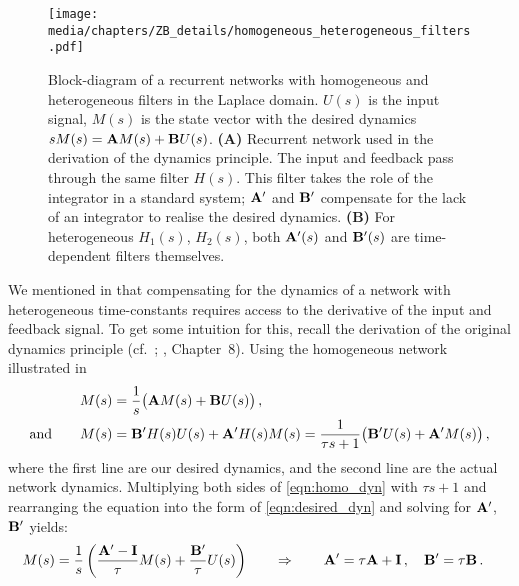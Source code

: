 \begin{figure}
	\texttt{[image: media/chapters/ZB\_details/homogeneous\_heterogeneous\_filters.pdf]}%
	{\label{fig:homogeneous_heterogeneous_filters_a}}%
	{\label{fig:homogeneous_heterogeneous_filters_b}}%
	\caption[Block-diagram of a recurrent networks with homogeneous and heterogeneous filters]{Block-diagram of a recurrent networks with homogeneous and heterogeneous filters in the Laplace domain. $U(s)$ is the input signal, $M(s)$ is the state vector with the desired \LTI dynamics $s M(s) = \mathbf{A} M(s) + \mathbf{B} U(s)$.
	\textbf{(A)} Recurrent network used in the derivation of the \NEF dynamics principle. The input and feedback pass through the same filter $H(s)$.
	This filter takes the role of the integrator in a standard \LTI system; $\mathbf{A}'$ and $\mathbf{B}'$ compensate for the lack of an integrator to realise the desired dynamics.
	\textbf{(B)} For heterogeneous $H_1(s)$, $H_2(s)$, both $\mathbf{A}'(s)$ and $\mathbf{B}'(s)$ are time-dependent filters themselves.
	}
	\label{fig:homogeneous_heterogeneous_filters}
\end{figure}

We mentioned in  that compensating for the dynamics of a network with heterogeneous time-constants requires access to the derivative of the input and feedback signal.
To get some intuition for this, recall the derivation of the original \NEF dynamics principle (cf.~; \cite{eliasmith2003neural}, Chapter~8).
Using the homogeneous network illustrated in 
\begin{align}
	M(s) &= \frac{1}{s} \bigl( \mathbf{A} M(s) + \mathbf{B} U(s) \bigr) \,, \label{eqn:desired_dyn}\\
	\text{and} \quad\quad M(s) &= \mathbf{B}' H(s) U(s) + \mathbf{A}' H(s) M(s) = \frac{1}{\tau s + 1} \bigl( \mathbf{B}' U(s) + \mathbf{A}' M(s) \bigr) \label{eqn:homo_dyn}\,,
\end{align}
where the first line are our desired dynamics, and the second line are the actual network dynamics.
Multiplying both sides of \cref{eqn:homo_dyn} with $\tau s + 1$ and rearranging the equation into the form of \cref{eqn:desired_dyn} and solving for $\mathbf{A}'$, $\mathbf{B}'$ yields:
\begin{align*}
	M(s) &= \frac{1}{s} \left( \frac{\mathbf{A}' - \mathbf{I}}{\tau} M(s) +  \frac{\mathbf{B}'}{\tau}  U(s) \right) \quad\quad \Rightarrow \quad\quad \mathbf{A}' = \tau \mathbf{A} + \mathbf{I} \,, \quad \mathbf{B}' = \tau \mathbf{B} \,.
\end{align*}

